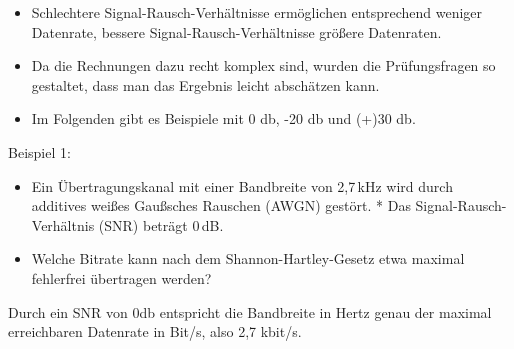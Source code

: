 \begin{frame}\begin{itemize}
  \item Schlechtere Signal-Rausch-Verhältnisse ermöglichen entsprechend weniger Datenrate, bessere Signal-Rausch-Verhältnisse größere Datenraten.
  \item Da die Rechnungen dazu recht komplex sind, wurden die Prüfungsfragen so gestaltet, dass man das Ergebnis leicht abschätzen kann.
  \item Im Folgenden gibt es Beispiele mit 0 db, -20 db und (+)30 db.
  \end{itemize}
\end{frame}

\begin{frame}Beispiel 1:

\begin{itemize}
  \item Ein Übertragungskanal mit einer Bandbreite von 2,7 kHz wird durch additives weißes Gaußsches Rauschen (AWGN) gestört. * Das Signal-Rausch-Verhältnis (SNR) beträgt 0 dB.
  \item Welche Bitrate kann nach dem Shannon-Hartley-Gesetz etwa maximal fehlerfrei übertragen werden?
  \end{itemize}
Durch ein SNR von 0db entspricht die Bandbreite in Hertz genau der maximal erreichbaren Datenrate in Bit/s, also 2,7 kbit/s.

\end{frame}

\begin{frame}
\end{frame}


